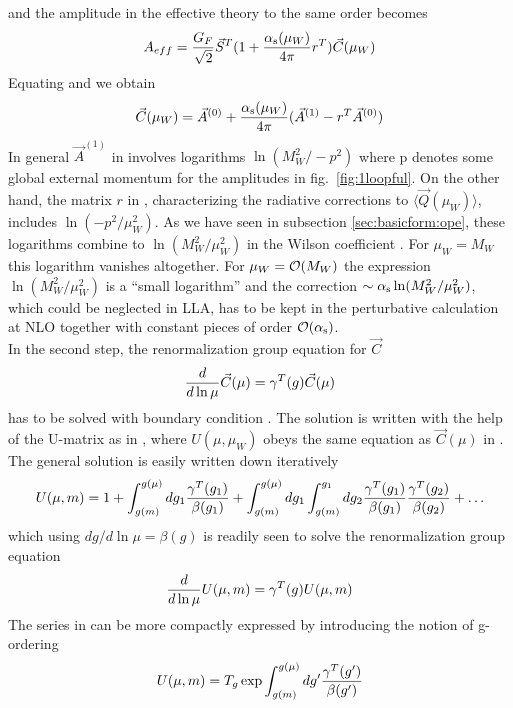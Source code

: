 and the amplitude in the effective theory to the same order becomes
\begin{equation}\label{aeff}  A_{eff}=
{G_F\over\sqrt{2}}\vec S^T(1+{\alpha_{\rm s}(\mu_W)\over 4\pi} r^T) \vec C(\mu_W)\end{equation}
Equating  and  we obtain
\begin{equation}\label{cmuw} \vec C(\mu_W)=
\vec A^{(0)}+{\alpha_{\rm s}(\mu_W)\over 4\pi}(\vec A^{(1)}-r^T\vec A^{(0)})  \end{equation}
In general $\vec A^{(1)}$ in  involves logarithms
$\ln(M^2_W/-p^2)$ where p denotes some global external momentum for the
amplitudes in fig.~\ref{fig:1loopful}.  On the other hand, the matrix
$r$ in , characterizing the radiative corrections to
$\langle\vec Q(\mu_W)\rangle$, includes $\ln(-p^2/\mu^2_W)$. As we have
seen in subsection \ref{sec:basicform:ope}, these logarithms combine to
$\ln(M^2_W/\mu^2_W)$ in the Wilson coefficient . For
$\mu_W=M_W$ this logarithm vanishes altogether. For $\mu_W={\cal O}(M_W)$
the expression $\ln(M^2_W/\mu^2_W)$ is a ``small logarithm'' and the
correction $\sim\alpha_{\rm s} \ln(M^2_W/\mu^2_W)$, which could be neglected in
LLA, has to be kept in the perturbative calculation at NLO together
with constant pieces of order ${\cal O}(\alpha_{\rm s})$.
\\
In the second step, the renormalization group equation for $\vec C$
\begin{equation}\label{rgcv}
{d\over d\ln\mu}\vec C(\mu)=\gamma^T(g)\vec C(\mu)   \end{equation}
has to be solved with boundary condition . The solution is
written with the help of the U-matrix as in , where
$U(\mu, \mu_W)$ obeys the same equation as $\vec C(\mu)$ in .
The general solution is easily written down iteratively
\begin{equation}\label{uit}
U(\mu, m)=1+\int^{g(\mu)}_{g(m)}dg_1{\gamma^T(g_1)\over\beta(g_1)}+
\int^{g(\mu)}_{g(m)}dg_1\int^{g_1}_{g(m)}dg_2
{\gamma^T(g_1)\over\beta(g_1)}{\gamma^T(g_2)\over\beta(g_2)}+\ldots \end{equation}
which using $dg/d\ln\mu=\beta(g)$ is readily seen to solve the
renormalization group equation
\begin{equation}\label{rgu}
{d\over d\ln\mu}U(\mu, m)=\gamma^T(g)U(\mu, m)   \end{equation}
The series in  can be more compactly expressed by introducing
the notion of g-ordering
\begin{equation}\label{utge}
U(\mu, m)=T_g \exp\int^{g(\mu)}_{g(m)}dg'{\gamma^T(g')\over\beta(g')}\end{equation}
